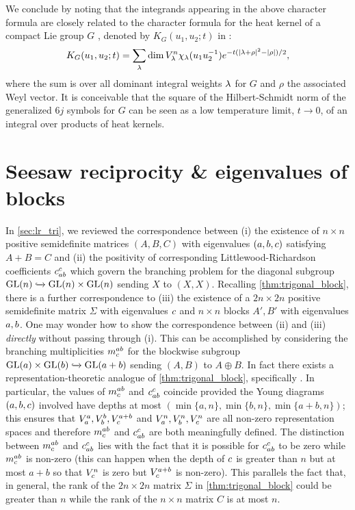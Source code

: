 \documentclass[notitlepage, 10pt]{article}
\begin{document}
We conclude by noting that the integrands appearing in the above character formula are closely related to the character formula for the heat kernel of a compact Lie group $G$ \cite{fegan1978heat}, denoted by $K_{G}(u_1, u_2 ; t)$ in \cite{mcswiggen2021harish}:
\begin{equation}
    K_{G}(u_1, u_2; t) = \sum_{\lambda} \dim V_{\lambda}^{n} \chi_{\lambda}(u_1 u_2^{-1}) e^{-t(\left|\lambda+\rho\right|^{2} - \left|\rho\right|)/2},
\end{equation}
where the sum is over all dominant integral weights $\lambda$ for $G$ and $\rho$ the associated Weyl vector.
It is conceivable that the square of the Hilbert-Schmidt norm of the generalized $6j$ symbols for $G$ can be seen as a low temperature limit, $t \to 0$, of an integral over products of heat kernels.

\section{Seesaw reciprocity \& eigenvalues of blocks}

In \cref{sec:lr_tri}, we reviewed the correspondence between (i) the existence of $n\times n$ positive semidefinite matrices $(A,B,C)$ with eigenvalues $(a,b,c)$ satisfying $A+B=C$ and (ii) the positivity of corresponding Littlewood-Richardson coefficients $c_{ab}^{c}$ which govern the branching problem for the diagonal subgroup $\operatorname{GL}(n) \xhookrightarrow{} \operatorname{GL}(n) \times \operatorname{GL}(n)$ sending $X$ to $(X,X)$.
Recalling \cref{thm:trigonal_block}, there is a further correspondence to (iii) the existence of a $2n \times 2n$ positive semidefinite matrix $\Sigma$ with eigenvalues $c$ and $n\times n$ blocks $A',B'$ with eigenvalues $a,b$.
One may wonder how to show the correspondence between (ii) and (iii) \textit{directly} without passing through (i).
This can be accomplished by considering the branching multiplicities $m^{ab}_{c}$ for the blockwise subgroup $\operatorname{GL}(a) \times \operatorname{GL}(b) \xhookrightarrow{} \operatorname{GL}(a+b)$ sending $(A,B)$ to $A\oplus B$.
In fact there exists a representation-theoretic analogue of \cref{thm:trigonal_block}, specifically \cite[Theorem 9.2.3]{goodman2000representations}.
In particular, the values of $m^{ab}_{c}$ and $c_{ab}^{c}$ coincide provided the Young diagrams $(a,b,c)$ involved have depths at most $(\min\{a,n\}, \min\{b,n\}, \min\{a+b,n\})$; this ensures that $V_{a}^{a}, V_{b}^{b}, V_{c}^{a+b}$ and $V_{a}^{n}, V_{b}^{n}, V_{c}^{n}$ are all non-zero representation spaces and therefore $m^{ab}_{c}$ and $c_{ab}^{c}$ are both meaningfully defined.
The distinction between $m^{ab}_{c}$ and $c_{ab}^{c}$ lies with the fact that it is possible for $c_{ab}^{c}$ to be zero while $m^{ab}_{c}$ is non-zero (this can happen when the depth of $c$ is greater than $n$ but at most $a+b$ so that $V_{c}^{n}$ is zero but $V_{c}^{a+b}$ is non-zero).
This parallels the fact that, in general, the rank of the $2n\times 2n$ matrix $\Sigma$ in \cref{thm:trigonal_block} could be greater than $n$ while the rank of the $n\times n$ matrix $C$ is at most $n$.
\end{document}

